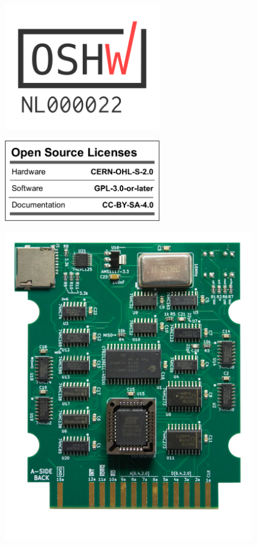 {
\centering

\includegraphics[width=0.5\textwidth]{img/certification-mark-NL000022-stacked.png}

\includegraphics[width=0.5\textwidth]{img/oshw_facts.png}

\includegraphics[width=0.8\textwidth]{img/sdcard-pcb-rev6.png}
}